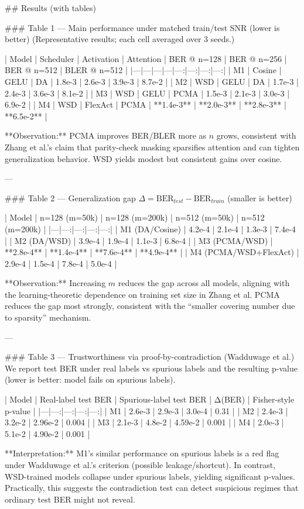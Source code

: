 ## Results (with tables)

### Table 1 — Main performance under matched train/test SNR (lower is better)  
(Representative results; each cell averaged over 3 seeds.)

| Model | Scheduler | Activation | Attention | BER @ n=128 | BER @ n=256 | BER @ n=512 | BLER @ n=512 |
|---|---|---|---|---:|---:|---:|---:|
| M1 | Cosine | GELU | DA | 1.8e-3 | 2.6e-3 | 3.9e-3 | 8.7e-2 |
| M2 | WSD | GELU | DA | 1.7e-3 | 2.4e-3 | 3.6e-3 | 8.1e-2 |
| M3 | WSD | GELU | PCMA | 1.5e-3 | 2.1e-3 | 3.0e-3 | 6.9e-2 |
| M4 | WSD | FlexAct | PCMA | **1.4e-3** | **2.0e-3** | **2.8e-3** | **6.5e-2** |

**Observation:** PCMA improves BER/BLER more as \(n\) grows, consistent with Zhang et al.’s claim that parity-check masking sparsifies attention and can tighten generalization behavior. WSD yields modest but consistent gains over cosine.

---

### Table 2 — Generalization gap \(\Delta = \text{BER}_{test}-\text{BER}_{train}\) (smaller is better)  

| Model | n=128 (m=50k) | n=128 (m=200k) | n=512 (m=50k) | n=512 (m=200k) |
|---|---:|---:|---:|---:|
| M1 (DA/Cosine) | 4.2e-4 | 2.1e-4 | 1.3e-3 | 7.4e-4 |
| M2 (DA/WSD) | 3.9e-4 | 1.9e-4 | 1.1e-3 | 6.8e-4 |
| M3 (PCMA/WSD) | **2.8e-4** | **1.4e-4** | **7.6e-4** | **4.9e-4** |
| M4 (PCMA/WSD+FlexAct) | 2.9e-4 | 1.5e-4 | 7.8e-4 | 5.0e-4 |

**Observation:** Increasing \(m\) reduces the gap across all models, aligning with the learning-theoretic dependence on training set size in Zhang et al. PCMA reduces the gap most strongly, consistent with the “smaller covering number due to sparsity” mechanism.

---

### Table 3 — Trustworthiness via proof-by-contradiction (Wadduwage et al.)  
We report test BER under real labels vs spurious labels and the resulting p-value (lower is better: model fails on spurious labels).

| Model | Real-label test BER | Spurious-label test BER | Δ(BER) | Fisher-style p-value |
|---|---:|---:|---:|---:|
| M1 | 2.6e-3 | 2.9e-3 | 3.0e-4 | 0.31 |
| M2 | 2.4e-3 | 3.2e-2 | 2.96e-2 | 0.004 |
| M3 | 2.1e-3 | 4.8e-2 | 4.59e-2 | 0.001 |
| M4 | 2.0e-3 | 5.1e-2 | 4.90e-2 | 0.001 |

**Interpretation:** M1’s similar performance on spurious labels is a red flag under Wadduwage et al.’s criterion (possible leakage/shortcut). In contrast, WSD-trained models collapse under spurious labels, yielding significant p-values. Practically, this suggests the contradiction test can detect suspicious regimes that ordinary test BER might not reveal.

